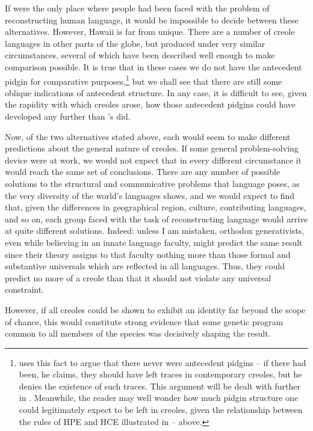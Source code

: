 If  were the only place where people had been faced with the problem of reconstructing human language, it would be impossible to decide between these alternatives. However, Hawaii is far from unique. There are a number of creole languages in other parts of the globe, but produced under very similar circumstances, several of which have been described well enough to make comparison possible. It is true that in these cases we do not have the antecedent pidgin for comparative purposes,\footnote{\citet{Alleyne1979} uses this fact to argue that there never were antecedent pidgins -- if there had been, he claims, they should have left traces in contemporary creoles, but he denies the existence of such traces. This argument will be dealt with further in . Meanwhile, the reader may well wonder how much pidgin structure one could legitimately expect to be left in creoles, given the relation\-ship between the rules of HPE and HCE illustrated in -- above.} but we shall see that there are still some oblique indications of antecedent structure. In any case, it is difficult to see, given the rapidity with which creoles arose, how those antecedent pidgins could have developed any further than 's did.


Now, of the two alternatives stated above, each would seem to make different predictions about the general nature of creoles. If some general problem-solving device were at work, we would not expect that in every different circumstance it would reach the same set of conclusions. There are any number of possible solutions to the struc\-tural and communicative problems that language poses, as the very diversity of the world's languages shows, and we would expect to find that, given the differences in geographical region, culture, contributing languages, and so on, each group faced with the task of reconstructing language would arrive at quite different solutions. Indeed: unless I am mistaken, orthodox generativists, even while believing in an innate language faculty, might predict the same result since their theory assigns to that faculty nothing more than those formal and substantive universals which are reflected in all languages. Thus, they could pre\-dict no more of a creole than that it should not violate any universal constraint.

However, if all creoles could be shown to exhibit an identity far beyond the scope of chance, this would constitute strong evidence that some genetic program common to all members of the species was decisively shaping the result.

